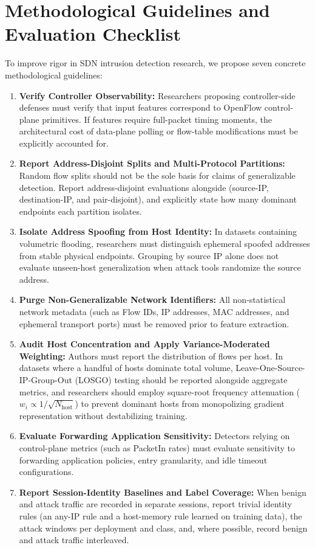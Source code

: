 \documentclass[journal]{IEEEtran}
\begin{document}
\section{Methodological Guidelines and Evaluation Checklist}\label{sec:guidelines}
To improve rigor in SDN intrusion detection research, we propose seven concrete methodological guidelines:
\begin{enumerate}
    \item \textbf{Verify Controller Observability:} Researchers proposing controller-side defenses must verify that input features correspond to OpenFlow control-plane primitives. If features require full-packet timing moments, the architectural cost of data-plane polling or flow-table modifications must be explicitly accounted for.
    \item \textbf{Report Address-Disjoint Splits and Multi-Protocol Partitions:} Random flow splits should not be the sole basis for claims of generalizable detection. Report address-disjoint evaluations alongside (source-IP, destination-IP, and pair-disjoint), and explicitly state how many dominant endpoints each partition isolates.
    \item \textbf{Isolate Address Spoofing from Host Identity:} In datasets containing volumetric flooding, researchers must distinguish ephemeral spoofed addresses from stable physical endpoints. Grouping by source IP alone does not evaluate unseen-host generalization when attack tools randomize the source address.
    \item \textbf{Purge Non-Generalizable Network Identifiers:} All non-statistical network metadata (such as Flow IDs, IP addresses, MAC addresses, and ephemeral transport ports) must be removed prior to feature extraction.
    \item \textbf{Audit Host Concentration and Apply Variance-Moderated Weighting:} Authors must report the distribution of flows per host. In datasets where a handful of hosts dominate total volume, Leave-One-Source-IP-Group-Out (LOSGO) testing should be reported alongside aggregate metrics, and researchers should employ square-root frequency attenuation ($w_i \propto 1 / \sqrt{N_{\text{host}}}$) to prevent dominant hosts from monopolizing gradient representation without destabilizing training.
    \item \textbf{Evaluate Forwarding Application Sensitivity:} Detectors relying on control-plane metrics (such as PacketIn rates) must evaluate sensitivity to forwarding application policies, entry granularity, and idle timeout configurations.
    \item \textbf{Report Session-Identity Baselines and Label Coverage:} When benign and attack traffic are recorded in separate sessions, report trivial identity rules (an any-IP rule and a host-memory rule learned on training data), the attack windows per deployment and class, and, where possible, record benign and attack traffic interleaved.
\end{enumerate}
\end{document}
